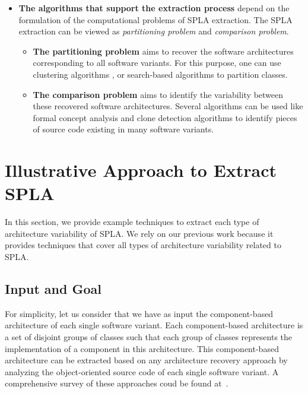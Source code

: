 \documentclass[graybox]{svmult}
\begin{document}
\begin{itemize}
	\item \textbf{The algorithms that support the extraction process} depend on the formulation of the computational problems of SPLA extraction. The SPLA extraction can be viewed as \textit{partitioning problem} and \textit{comparison problem}.	
	
    \begin{itemize}
        \item \textbf{The partitioning problem} aims to recover the software architectures corresponding to all software variants. For this purpose, one can use clustering algorithms \cite{shatnawi2017recovering}, or search-based algorithms \cite{rathee2019multi} to partition classes.
        
        \item \textbf{The comparison problem} aims to identify the variability between these recovered software architectures. Several algorithms can be used like formal concept analysis \cite{carbonnel2017feature,shatnawi2017recovering} and clone detection algorithms \cite{frenzel2007extending,kolb2006refactoring,koschke2009extending} to identify pieces of source code existing in many software variants.
    \end{itemize}
    
\end{itemize}


\section{Illustrative Approach to Extract SPLA}
\label{sec:example-approach}
In this section, we provide example techniques to extract each type of architecture variability of SPLA. We rely on our previous work \cite{shatnawi2017recovering} because it provides techniques that cover all types of architecture variability related to SPLA. 

\subsection{Input and Goal}

For simplicity, let us consider that we have as input the component-based architecture of each single software variant. Each component-based architecture is a set of disjoint groups of classes such that each group of classes represents the implementation of a component in this architecture. This component-based architecture can be extracted based on any architecture recovery approach by analyzing the object-oriented source code of each single software variant. A comprehensive survey of these approaches coud be found at~\cite{abdellatiftaxonomy,ducasse2009software,lima2017investigating}. 
\end{document}
